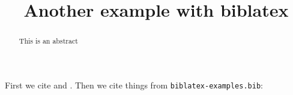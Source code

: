 \documentclass[version=final,biblatex]{iacrcc}
\title{Another example with biblatex}
\begin{document}
\maketitle
\begin{abstract}
  This is an abstract
\end{abstract}
First we cite \cite{sample} and \cite{noemph}.
Then we cite things from \texttt{biblatex-examples.bib}: 
\cite{kowalik}
\cite{westfahl:space}
\cite{aksin}
\cite{angenendt}
\cite{baez/article}
\cite{bertram}
\cite{doody}
\cite{matuz:doody}
\cite{gillies}
\cite{glashow}
\cite{herrmann}
\cite{kastenholz}
\cite{murray}
\cite{reese}
\cite{sarfraz}
\cite{shore}
\cite{sigfridsson}
\cite{spiegelberg}
\cite{springer}
\cite{weinberg}
\cite{yoon}
\cite{augustine}
\cite{averroes/bland}
\cite{averroes/hannes}
\cite{averroes/hercz}
\cite{cicero}
\cite{coleridge}
\cite{companion}
\cite{cotton}
\cite{gerhardt}
\cite{gonzalez}
\cite{hammond}
\cite{iliad}
\cite{knuth:ct:a}
\cite{knuth:ct:b}
\cite{knuth:ct:c}
\cite{knuth:ct:d}
\cite{knuth:ct:e}
\cite{kullback}
\cite{kullback:reprint}
\cite{malinowski}
\cite{maron}
\cite{massa}
\cite{moore}
\cite{nietzsche:ksa}
\cite{nietzsche:ksa1}
\cite{nussbaum}
\cite{piccato}
\cite{vangennep}
\cite{vangennep:trans}
\cite{wilde}
\cite{worman}
\cite{britannica}
\cite{gaonkar}
\cite{gaonkar:in}
\cite{westfahl:frontier}
\cite{kant:kpv}
\cite{kant:ku}
\cite{nietzsche:historie}
\cite{brandt}
\cite{hyman}
\cite{pines}
\cite{salam}
\cite{cms}
\cite{baez/online}
\cite{ctan}
\cite{itzhaki}
\cite{markey}
\cite{wassenberg}
\cite{almendro}
\cite{kowalik}
\cite{laufenberg}
\cite{sorace}
\cite{jcg}
\cite{chiu}
\cite{padhye}
\cite{geer}
\cite{loh}

\printbibliography
\end{document}
